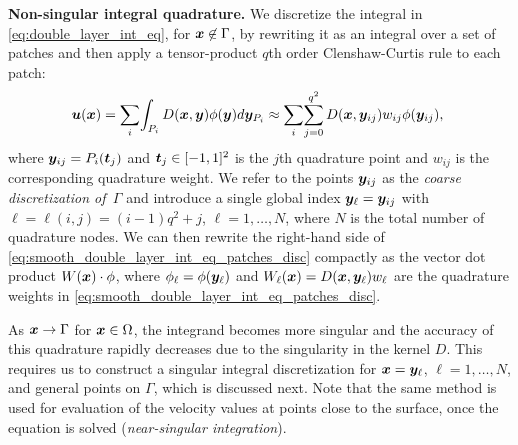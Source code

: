 \textbf{Non-singular integral quadrature. }
We discretize the integral in \cref{eq:double_layer_int_eq}, for ${\bm{x}}
\not\in \Gamma$, by rewriting it as an integral over a set of
patches and then
apply a tensor-product $q$th order Clenshaw-Curtis rule to each patch:
\begin{equation}
 \!\!{\bm{u}}({\bm{x}}) = \sum_i\!\int_{P_i}D({\bm{x}}, {\bm{y}}) \phi({\bm{y}})d{\bm{y}}_{P_i} \approx \sum_i \!\sum_{j=0}^{q^2} D({\bm{x}},{\bm{y}}_{ij}) w_{ij}  \phi({\bm{y}}_{ij}),
  \label{eq:smooth_double_layer_int_eq_patches_disc}
\end{equation}
where ${\bm{y}}_{ij} = P_i(\bm{t}_j)$ and $\bm{t}_j\in[-1,1]^2$ is
the $j$th quadrature point and $w_{ij}$ is the
corresponding quadrature weight.
We refer to the points ${\bm{y}}_{ij}$ as the \textit{coarse discretization
  of\, $\Gamma$} and 
introduce a single global index ${\bm{y}}_{\ell} = {\bm{y}}_{ij}$ with $\ell
= \ell(i,j) = (i-1)q^2 + j$, $\ell = 1, \ldots, N$, where $N$ is the total number of quadrature nodes.
We can then rewrite the right-hand side of \eqref{eq:smooth_double_layer_int_eq_patches_disc} compactly as the vector dot product $W({\bm{x}}) \cdot \phi$, where  $\phi_\ell = \phi({\bm{y}}_\ell)$ and $W_\ell({\bm{x}}) = D({\bm{x}},{\bm{y}}_\ell)w_\ell$ are the quadrature weights in \cref{eq:smooth_double_layer_int_eq_patches_disc}.

As ${\bm{x}} \to \Gamma$ for ${\bm{x}}\in \Omega$, the integrand becomes more singular 
and the accuracy of this quadrature rapidly decreases due
to the singularity in the kernel $D$. This requires us to
construct a singular integral discretization for ${\bm{x}} = {\bm{y}}_\ell$,
$\ell=1,\ldots ,N$, and general points on $\Gamma$, which is discussed
next. Note that the same method is
used for evaluation of the velocity values at points close to the
surface, once the equation is solved (\emph{near-singular
  integration}).

